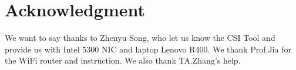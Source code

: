 \documentclass[conference]{IEEEtran}
\begin{document}
\section*{Acknowledgment}
We want to say thanks to Zhenyu Song, who let us know the CSI Tool and provide us with Intel 5300 NIC and laptop Lenovo R400. We thank Prof.Jia for the WiFi router and instruction. We also thank TA.Zhang's help.



\end{document}
